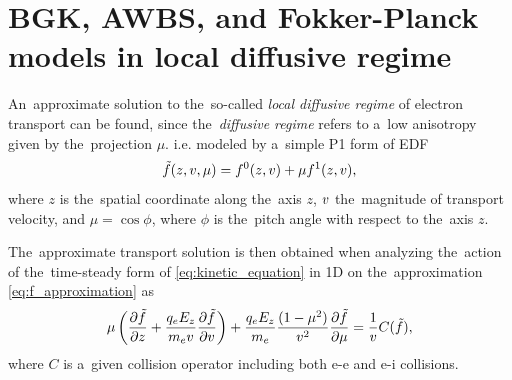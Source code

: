\section{BGK, AWBS, and Fokker-Planck models in local diffusive regime}
\label{sec:DiffusiveKinetics}


An~approximate solution to the~so-called \textit{local diffusive regime} 
of electron transport can be found, since the~\textit{diffusive regime}
refers to a~low anisotropy given by the~projection $\mu$. i.e.
modeled by a~simple P1 form of EDF  
\begin{equation}
  \tilde{f}(z, v, \mu) = f^0(z, v) + \mu f^1(z, v),
  \label{eq:f_approximation}
\end{equation}
where $z$ is the~spatial coordinate along the~axis $z$, $v$ 
the~magnitude of transport velocity, and $\mu = \cos\phi$, where $\phi$ 
is the~pitch angle with respect to the~axis $z$.


The~approximate transport solution is then obtained when analyzing 
the~action of the~time-steady form of \eqref{eq:kinetic_equation} in 1D 
on the~approximation \eqref{eq:f_approximation} as
\begin{equation}
  \mu\left(\frac{\partial{\tilde{f}}}{\partial{z}} 
  + \frac{q_eE_z}{m_ev}\frac{\partial{\tilde{f}}}{\partial{v}}\right) 
  + \frac{q_eE_z}{m_e}\frac{(1-\mu^2)}{v^2}\frac{\partial{\tilde{f}}}{\partial{\mu}}
  = \frac{1}{v}C(\tilde{f}) ,
  \label{eq:1D_kinetic_equation}
\end{equation}
where $C$ is a~given collision operator including both e-e and e-i collisions.

